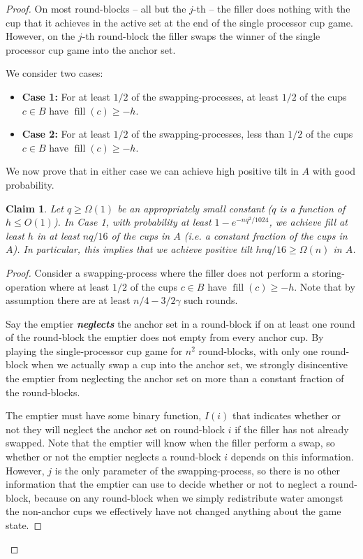 \documentclass[twocolumn]{article}[10pt]
\newcommand{\defn}[1]{{\textit{\textbf{\boldmath #1}}}\xspace}
\DeclareMathOperator{\fil}{\text{fill}}
\newtheorem{clm}{Claim}
\begin{document}
\begin{proof}
{On most round-blocks -- all but the $j$-th -- the filler does nothing with the
cup that it achieves in the active set at the end of the single processor cup
game. However, on the $j$-th round-block the filler swaps the winner of the
single processor cup game into the anchor set.

We consider two cases:
\begin{itemize}
  \item \textbf{Case 1:} For at least $1/2$ of the swapping-processes, at
    least $1/2$ of the cups $c \in B$ have $\fil(c) \ge -h$.
  \item \textbf{Case 2:} For at least $1/2$ of the swapping-processes, less
    than $1/2$ of the cups $c \in B$ have $\fil(c) \ge -h$.
\end{itemize}
We now prove that in either case we can achieve high positive tilt in $A$ with
good probability.

\begin{clm} \label{clm:reg} 
  Let $q\ge \Omega(1)$ be an appropriately small constant ($q$ is a function of
  $h\le O(1)$). In Case 1, with probability at least $1-e^{-nq^2/1024}$, we
  achieve fill at least $h$ in at least $nq/16$ of the cups in $A$ (i.e. a
  constant fraction of the cups in $A$). In particular, this implies that we
  achieve positive tilt $hnq/16 \ge \Omega(n)$ in $A$.
\end{clm}
\begin{proof}
  Consider a swapping-process where the filler does not perform a
  storing-operation where at least $1/2$ of the cups $c \in B$ have $\fil(c)
  \ge -h$. Note that by assumption there are at least $n/4 - 3/2 \gamma$ such rounds.
 
  Say the emptier \defn{neglects} the anchor set in a round-block if on at
  least one round of the round-block the emptier does not empty from every
  anchor cup. By playing the single-processor cup game for $n^2$ round-blocks,
  with only one round-block when we actually swap a cup into the anchor set, we
  strongly disincentive the emptier from neglecting the anchor set on more
  than a constant fraction of the round-blocks. 

  The emptier must have some binary function, $I(i)$ that indicates whether or
  not they will neglect the anchor set on round-block $i$ if the filler has not
  already swapped. Note that the emptier will know when the filler perform a
  swap, so whether or not the emptier neglects a round-block $i$ depends on
  this information. However, $j$ is the only parameter of the swapping-process,
  so there is no other information that the emptier can use to decide whether
  or not to neglect a round-block, because on any round-block when we simply
  redistribute water amongst the non-anchor cups we effectively have not
  changed anything about the game state. 


\end{proof}}
\end{proof}
\end{document}
